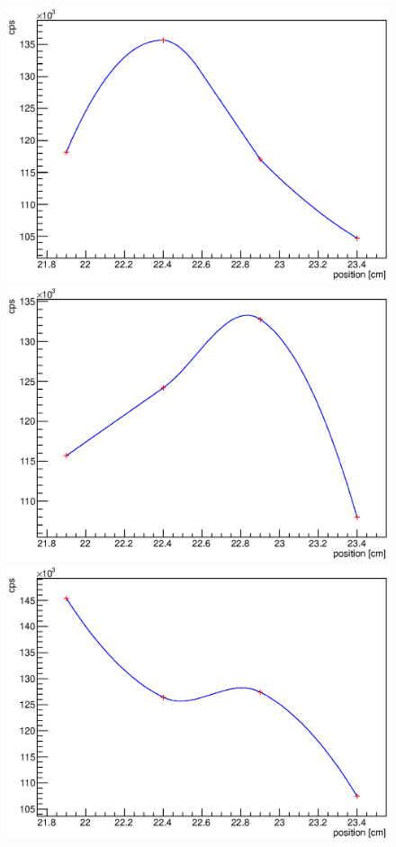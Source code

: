 \begin{figure}
	\begin{minipage}[d]{0.24 \textwidth}
		  \includegraphics[width=\textwidth]{graphics/cobalt/modules/7A.eps}
	\end{minipage}
	\begin{minipage}[d]{0.24 \textwidth}
		  \includegraphics[width=\textwidth]{graphics/cobalt/modules/7B.eps}
	\end{minipage}
	\begin{minipage}[d]{0.24 \textwidth}
		  \includegraphics[width=\textwidth]{graphics/cobalt/modules/8A.eps}

\end{minipage}
\end{figure}
